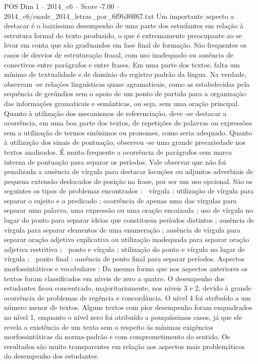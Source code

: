 \begin{textsample}{POS Dim 1 – 2014\_c6 – Score -7.00 – 2014\_c6/enade\_2014\_letras\_por\_6f9b30ff67.txt}
Um importante aspecto a destacar é o baixíssimo desempenho de uma parte dos estudantes em relação à estrutura formal do texto produzido, o que é extremamente preocupante ao se levar em conta que são graduandos em fase final de formação.
São frequentes os casos de desvios de estruturação frasal, com uso inadequado ou ausência de conectivos entre parágrafos e entre frases.
Em uma parte dos textos, falta um mínimo de textualidade e de domínio do registro padrão da língua.
Na verdade, observam -se relações linguísticas quase agramaticais, como as estabelecidas pela sequência de gerúndios sem o apoio de um ponto de partida para a organização das informações gramaticais e semânticas, ou seja, sem uma oração principal.
Quanto à utilização dos mecanismos de referenciação, deve -se destacar a ocorrência, em uma boa parte dos textos, de repetições de palavras ou expressões sem a utilização de termos sinônimos ou pronomes, como seria adequado.
Quanto à utilização dos sinais de pontuação, observou -se uma grande precariedade nos textos analisados.
É muito frequente a ocorrência de parágrafos sem marca interna de pontuação para separar os períodos.
Vale observar que não foi penalizada a ausência de vírgula para destacar locuções ou adjuntos adverbiais de pequena extensão deslocados de posição na frase, por ser um uso opcional.
São os seguintes os tipos de problemas encontrados :  vírgula : utilização de vírgula para separar o sujeito e o predicado ; ocorrência de apenas uma das vírgulas para separar uma palavra, uma expressão ou uma oração encaixada ; uso de vírgula no lugar do ponto para separar ideias que constituem períodos distintos ; ausência de vírgula para separar elementos de uma enumeração ; ausência de vírgula para  separar oração adjetiva explicativa ou utilização inadequada para separar oração adjetiva restritiva ;  ponto e vírgula : utilização do ponto e vírgula no lugar de vírgula ;  ponto final : ausência de ponto final para separar períodos.
Aspectos morfossintáticos e vocabulares : Da mesma forma que nos aspectos anteriores os textos foram classificados em níveis de zero a quatro.
O desempenho dos estudantes ficou concentrado, majoritariamente, nos níveis 3 e 2, devido à grande ocorrência de problemas de regência e concordância.
O nível 4 foi atribuído a um número menor de textos.
Alguns textos com pior desempenho foram enquadrados no nível 1, enquanto o nível zero foi atribuído a pouquíssimos casos, já que ele revela a existência de um texto sem o respeito às mínimas exigências morfossintáticas da norma-padrão e com comprometimento do sentido.
Os resultados são muito transparentes em relação aos aspectos mais problemáticos do desempenho dos estudantes.

\end{textsample}
